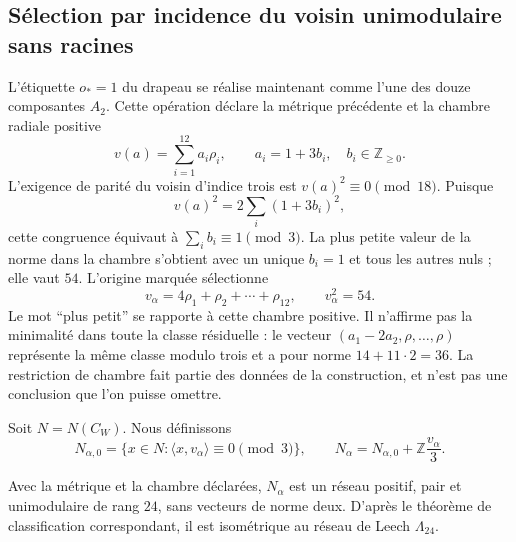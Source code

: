 \subsection{Sélection par incidence du voisin unimodulaire sans racines}
\label{exc:leech}



L'étiquette $o_*=1$ du drapeau se réalise maintenant comme l'une des
douze composantes $A_2$. Cette opération déclare la métrique précédente et
la chambre radiale positive
\[
 v(a)=\sum_{i=1}^{12}a_i\rho_i,
 \qquad a_i=1+3b_i,\quad b_i\in\mathbb Z_{\geq0}.
\]
L'exigence de parité du voisin d'indice trois est $v(a)^2\equiv0\pmod{18}$. Puisque
\[
 v(a)^2=2\sum_i(1+3b_i)^2,
\]
cette congruence équivaut à $\sum_i b_i\equiv1\pmod3$. La plus petite
valeur de la norme dans la chambre s'obtient avec un unique $b_i=1$ et
tous les autres nuls ; elle vaut $54$. L'origine marquée sélectionne
\begin{equation}
 v_\alpha=4\rho_1+\rho_2+\cdots+\rho_{12},
 \qquad v_\alpha^2=54.
 \label{exc:vector}
\end{equation}
Le mot ``plus petit'' se rapporte à cette chambre positive. Il n'affirme pas la minimalité dans toute la classe résiduelle : le vecteur $(a_1-2a_2,\rho,\ldots,\rho)$ représente la même classe modulo trois et a pour norme $14+11\cdot2=36$. La restriction de chambre fait partie des données de la construction, et n'est pas une conclusion que l'on puisse omettre.

Soit $N=N(C_W)$. Nous définissons
\begin{equation}
 N_{\alpha,0}=\{x\in N:\langle x,v_\alpha\rangle\equiv0\pmod3\},
 \qquad
 N_\alpha=N_{\alpha,0}+\mathbb Z\frac{v_\alpha}{3}.
 \label{exc:vecino}
\end{equation}

\begin{theorem}
\label{exc:teorema-leech}
Avec la métrique et la chambre déclarées, $N_\alpha$ est un réseau
positif, pair et unimodulaire de rang $24$, sans vecteurs de norme deux.
D'après le théorème de classification correspondant, il est isométrique au
réseau de Leech $\Lambda_{24}$.
\end{theorem}

